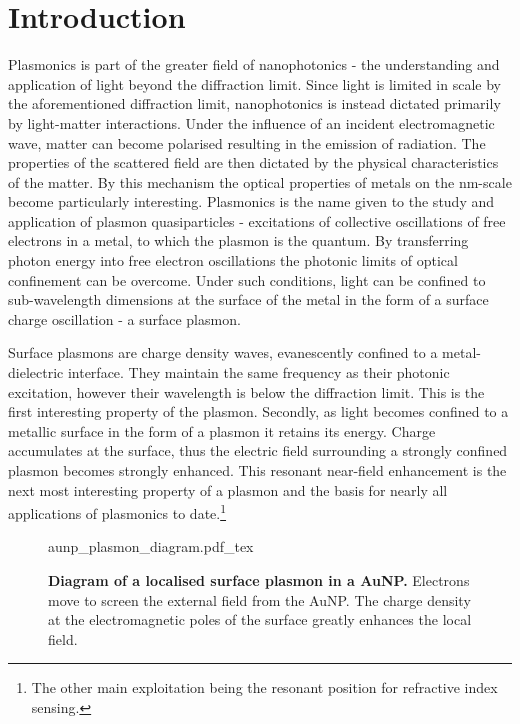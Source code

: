 \documentclass[12pt, a4paper, twoside]{book}
\begin{document}
\chapter{Introduction}

Plasmonics is part of the greater field of nanophotonics - the understanding and application of light beyond the diffraction limit. Since light is limited in scale by the aforementioned diffraction limit, nanophotonics is instead dictated primarily by light-matter interactions. Under the influence of an incident electromagnetic wave, matter can become polarised resulting in the emission of radiation. The properties of the scattered field are then dictated by the physical characteristics of the matter. By this mechanism the optical properties of metals on the nm-scale become particularly interesting.
Plasmonics is the name given to the study and application of plasmon quasiparticles - excitations of collective oscillations of free electrons {\color{red} in a metal}, to which the plasmon is the quantum. By transferring photon energy into free electron oscillations the photonic limits of optical confinement can be overcome.
Under such conditions, light can be confined to sub-wavelength dimensions at the surface of the metal in the form of a surface charge oscillation - a surface plasmon.

Surface plasmons are charge density waves, evanescently confined to a metal-dielectric interface. They maintain the same frequency as their photonic excitation, however their wavelength is below the diffraction limit. This is the first interesting property of the plasmon. Secondly, as light becomes confined to a metallic surface in the form of a plasmon {\color{red}it retains its energy.} Charge accumulates at the surface, thus the electric field surrounding a strongly confined plasmon becomes strongly enhanced. This resonant near-field enhancement is the next most interesting property of a plasmon and the basis for nearly all applications of plasmonics to date.\footnote{The other main exploitation being the resonant position for refractive index sensing.}

\begin{figure}[bt]
\centering
\fontsize{10pt}{1em}\selectfont
\def\svgwidth{0.6\textwidth}
{aunp_plasmon_diagram.pdf_tex}
\caption[Diagram of a localised surface plasmon in a AuNP.]{\textbf{Diagram of a localised surface plasmon in a AuNP.} Electrons move to screen the external field from the AuNP. The charge density at the electromagnetic poles of the surface greatly enhances the local field.}
\label{fig:aunp_plasmon}
\end{figure}
\end{document}
